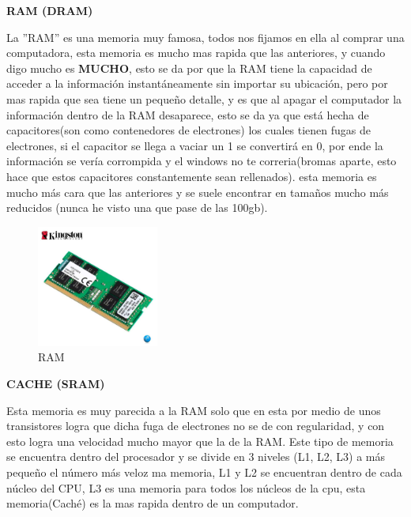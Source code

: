 \documentclass{article}
\begin{document}
\vspace{3cm}
\begin{center}
    \textbf{RAM (DRAM)}
\end{center}
La ''RAM'' es una memoria muy famosa, todos nos fijamos en ella al comprar una computadora, esta memoria es mucho mas rapida que las anteriores, y cuando digo mucho es \textbf{MUCHO}, esto se da por que la RAM tiene la capacidad de acceder a la información instantáneamente sin importar su ubicación, pero por mas rapida que sea tiene un pequeño detalle, y es que al apagar el computador la información dentro de la RAM desaparece, esto se da ya que está hecha de capacitores(son como contenedores de electrones) los cuales tienen fugas de electrones, si el capacitor se llega a vaciar un 1 se convertirá en 0,  por ende la información se vería corrompida y el windows no te correria(bromas aparte, esto hace que estos capacitores constantemente sean rellenados). esta memoria es mucho más cara que las anteriores y se suele encontrar en tamaños mucho más reducidos (nunca he visto una que pase de las 100gb).\cite{pdfu}
\begin{figure}
    \centering
    \includegraphics[width=4cm]{RAM.jpg}
    \caption{RAM}
    \label{fig:my_label}
\end{figure}

\vspace{5cm}

\begin{center}
    \textbf{CACHE (SRAM)}
\end{center}

\vspace{1cm}
Esta memoria es muy parecida a la RAM solo que en esta por medio de unos transistores logra que dicha fuga de electrones no se de con regularidad, y con esto logra una velocidad mucho mayor que la de la RAM. Este tipo de memoria se encuentra dentro del procesador y se divide en 3 niveles (L1, L2, L3) a más pequeño el número más veloz ma memoria, L1 y L2 se encuentran dentro de cada núcleo del CPU, L3 es una memoria para todos los núcleos de la cpu, esta memoria(Caché) es la mas rapida dentro de un computador. \cite{pdfu} 
\vspace{3cm}
\end{document}
